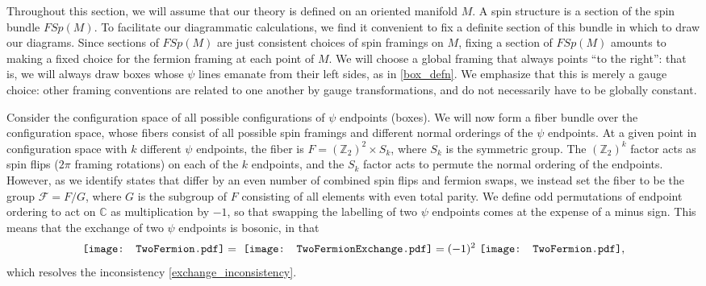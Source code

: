 \documentclass[12pt,a4paper]{article}
\newcommand{\cc}{\mathbb{C}}
\newcommand{\zt}{\mathbb{Z}_2}
\newcommand{\mcf}{\mathcal{F}}
\newcommand{\TwoFermion}{\mathord{\vcenter{\hbox{\texttt{[image: TwoFermion.pdf]}}}}}
\newcommand{\TwoFermionExchange}{\mathord{\vcenter{\hbox{\texttt{[image: TwoFermionExchange.pdf]}}}}}
\begin{document}
Throughout this section, we will assume that our theory is defined on an oriented manifold $M$. A spin structure is a section of the spin bundle $FSp(M)$. To facilitate our diagrammatic calculations, we find it convenient to fix a definite section of this bundle in which to draw our diagrams. Since sections of $FSp(M)$ are just consistent choices of spin framings on $M$, fixing a section of $FSp(M)$ amounts to making a fixed choice for the fermion framing at each point of $M$. We will choose a global framing that always points ``to the right'': that is, we will always draw boxes whose $\psi$ lines emanate from their left sides, as in \eqref{box_defn}. We emphasize that this is merely a gauge choice: other framing conventions are related to one another by gauge transformations, and do not necessarily have to be globally constant. 

Consider the configuration space of all possible configurations of $\psi$ endpoints (boxes). We will now form a fiber bundle over the configuration space, whose fibers consist of all possible spin framings and different normal orderings of the $\psi$ endpoints. At a given point in configuration space with $k$ different $\psi$ endpoints, the fiber is $F = (\zt)^2\times S_k$, where $S_k$ is the symmetric group. The $(\zt)^k$ factor acts as spin flips ($2\pi$ framing rotations) on each of the $k$ endpoints, and the $S_k$ factor acts to permute the normal ordering of the endpoints. However, as we identify states that differ by an even number of combined spin flips and fermion swaps, we instead set the fiber to be the group $\mcf = F/G$, where $G$ is the subgroup of $F$ consisting of all elements with even total parity. We define odd permutations of endpoint ordering to act on $\cc$ as multiplication by $-1$, so that swapping the labelling of two $\psi$ endpoints comes at the expense of a minus sign. This means that the exchange of two $\psi$ endpoints is bosonic, in that 
\begin{align} \label{boxbraid}
\TwoFermion =\ \TwoFermionExchange = (-1)^2\ \TwoFermion,
\end{align}
which resolves the inconsistency \eqref{exchange_inconsistency}. 
\end{document}

